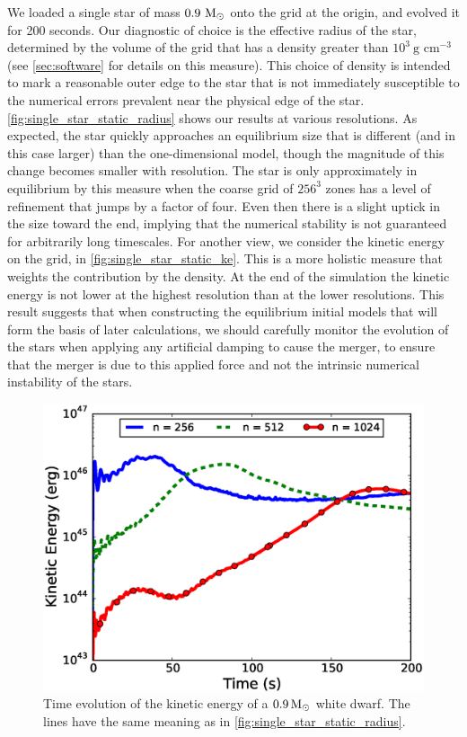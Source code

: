 \documentclass[12pt]{article}
\begin{document}
We loaded a single star of mass $0.9\ \msolar$ onto the grid at the
origin, and evolved it for 200 seconds. Our diagnostic of choice is
the effective radius of the star, determined by the volume of the grid
that has a density greater than $10^3\ \text{g cm}^{-3}$ (see
\autoref{sec:software} for details on this measure). This choice
of density is intended to mark a reasonable outer edge to the star
that is not immediately susceptible to the numerical errors prevalent
near the physical edge of the star.
\autoref{fig:single_star_static_radius} shows our results at various
resolutions.  As expected, the star quickly approaches an equilibrium
size that is different (and in this case larger) than the
one-dimensional model, though the magnitude of this change becomes
smaller with resolution. The star is only approximately in equilibrium
by this measure when the coarse grid of $256^3$ zones has a level of
refinement that jumps by a factor of four. Even then there is a slight uptick
in the size toward the end, implying that the numerical stability is
not guaranteed for arbitrarily long timescales. For another view, we
consider the kinetic energy on the grid, in \autoref{fig:single_star_static_ke}.
This is a more holistic measure that weights the contribution by the density.
At the end of the simulation the kinetic energy is not lower at the highest
resolution than at the lower resolutions. This result suggests
that when constructing the equilibrium initial models that will form the
basis of later calculations, we should carefully monitor the evolution
of the stars when applying any artificial damping to cause the
merger, to ensure that the merger is due to this applied force and not
the intrinsic numerical instability of the stars.
\begin{figure}[h!]
  \centering
  \includegraphics[scale=0.80,trim=0.1in 0.0in 0.55in 0.45in,clip]{plots/single_star_static_ke}
  \caption[Kinetic energy evolution of static white dwarf]
          {Time evolution of the kinetic energy of a $0.9\, \mathrm{M}_\odot$
           white dwarf. The lines have the same meaning as in \autoref{fig:single_star_static_radius}.
           \label{fig:single_star_static_ke}}
\end{figure}
\end{document}
